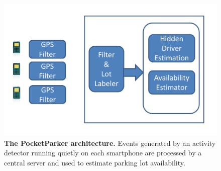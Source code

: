 \begin{figure}
\centering
\includegraphics[width=\columnwidth]{./figures/blockdiagram.pdf}

\caption{\textbf{The PocketParker architecture.} Events generated by an
activity detector running quietly on each smartphone are processed by a
central server and used to estimate parking lot availability.}

\label{fig-arch}
\end{figure}
